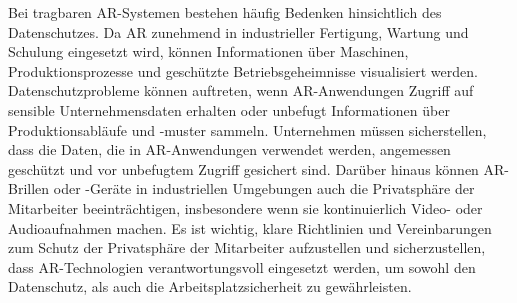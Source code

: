 Bei tragbaren AR-Systemen bestehen häufig Bedenken hinsichtlich des
Datenschutzes. Da AR zunehmend in industrieller Fertigung, Wartung und Schulung
eingesetzt wird, können Informationen über Maschinen, Produktionsprozesse und
geschützte Betriebsgeheimnisse visualisiert werden. Datenschutzprobleme können
auftreten, wenn AR-Anwendungen Zugriff auf sensible Unternehmensdaten erhalten
oder unbefugt Informationen über Produktionsabläufe und -muster sammeln.
Unternehmen müssen sicherstellen, dass die Daten, die in AR-Anwendungen
verwendet werden, angemessen geschützt und vor unbefugtem Zugriff gesichert
sind. Darüber hinaus können AR-Brillen oder -Geräte in industriellen Umgebungen
auch die Privatsphäre der Mitarbeiter beeinträchtigen, insbesondere wenn sie
kontinuierlich Video- oder Audioaufnahmen machen. Es ist wichtig, klare
Richtlinien und Vereinbarungen zum Schutz der Privatsphäre der Mitarbeiter
aufzustellen und sicherzustellen, dass AR-Technologien verantwortungsvoll
eingesetzt werden, um sowohl den Datenschutz, als auch die
Arbeitsplatzsicherheit zu gewährleisten.\cite{de2018augmented,9613426}\\